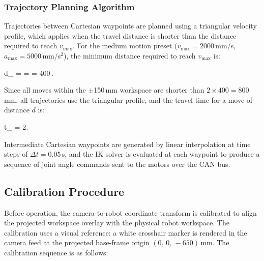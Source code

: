\subsubsection{Trajectory Planning Algorithm}
\hspace{1.27cm}
Trajectories between Cartesian waypoints are planned using
a triangular velocity profile, which applies when the
travel distance is shorter than the distance required to
reach $v_{\max}$. For the medium motion preset
($v_{\max} = 2000$\,mm/s, $a_{\max} = 5000$\,mm/s$^2$),
the minimum distance required to reach $v_{\max}$ is:

\begin{cequation}
    d_{} = 
    =  = 400\,.
    \label{eq:daccel}
\end{cequation}

Since all moves within the $\pm$150\,mm workspace are
shorter than $2 \times 400 = 800$\,mm, all trajectories
use the triangular profile, and the travel time for a move
of distance $d$ is:

\begin{cequation}
    t_{} = 2.
    \label{eq:tmove}
\end{cequation}

Intermediate Cartesian waypoints are generated by linear
interpolation at time steps of $\Delta t = 0.05$\,s, and
the IK solver is evaluated at each waypoint to produce a
sequence of joint angle commands sent to the motors over
the CAN bus.

\subsection{Calibration Procedure}\label{sec:calibration}
\hspace{1.27cm}
Before operation, the camera-to-robot coordinate transform
is calibrated to align the projected workspace overlay with
the physical robot workspace. The calibration uses a visual
reference: a white crosshair marker is rendered in the
camera feed at the projected base-frame origin
$(0,\, 0,\, -650)$\,mm. The calibration sequence is as
follows:

